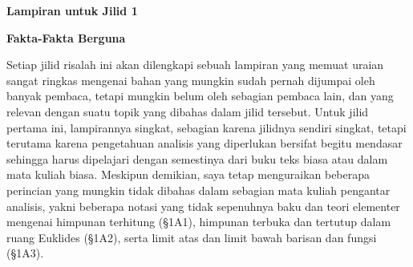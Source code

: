 
\def\chaptername{Lampiran}
\def\sectionname{Pendahuluan}

\gdef\topparagraph{}
\gdef\bottomparagraph{Lampiran untuk Jilid\ 1 {\it pendahuluan}}

\centerline{\bf Lampiran untuk Jilid 1}

\medskip

\centerline{\bf Fakta-Fakta Berguna}

\medskip

Setiap jilid risalah ini akan dilengkapi sebuah lampiran yang memuat uraian
sangat ringkas mengenai bahan yang mungkin sudah pernah dijumpai oleh banyak
pembaca, tetapi mungkin belum oleh sebagian pembaca lain, dan yang relevan
dengan suatu topik yang dibahas dalam jilid tersebut. Untuk jilid pertama ini,
lampirannya singkat, sebagian karena jilidnya sendiri singkat, tetapi terutama
karena pengetahuan analisis yang diperlukan bersifat begitu mendasar sehingga
harus dipelajari dengan semestinya dari buku teks biasa atau dalam mata kuliah
biasa. Meskipun demikian, saya tetap menguraikan beberapa perincian yang
mungkin tidak dibahas dalam sebagian mata kuliah pengantar analisis, yakni
beberapa notasi yang tidak sepenuhnya baku dan teori elementer mengenai
himpunan terhitung (\S1A1), himpunan terbuka dan tertutup dalam ruang Euklides
(\S1A2), serta limit atas dan limit bawah barisan dan fungsi (\S1A3).

\discrpage
